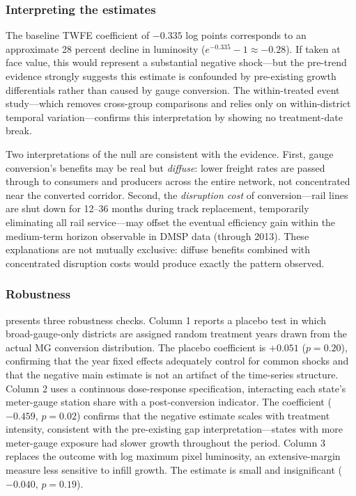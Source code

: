 \documentclass[12pt]{article}
\begin{document}
\subsubsection*{Interpreting the estimates} The baseline TWFE coefficient of $-0.335$ log points corresponds to an approximate 28 percent decline in luminosity ($e^{-0.335} - 1 \approx -0.28$). If taken at face value, this would represent a substantial negative shock---but the pre-trend evidence strongly suggests this estimate is confounded by pre-existing growth differentials rather than caused by gauge conversion. The within-treated event study---which removes cross-group comparisons and relies only on within-district temporal variation---confirms this interpretation by showing no treatment-date break.

Two interpretations of the null are consistent with the evidence. First, gauge conversion's benefits may be real but \emph{diffuse}: lower freight rates are passed through to consumers and producers across the entire network, not concentrated near the converted corridor. Second, the \emph{disruption cost} of conversion---rail lines are shut down for 12--36 months during track replacement, temporarily eliminating all rail service---may offset the eventual efficiency gain within the medium-term horizon observable in DMSP data (through 2013). These explanations are not mutually exclusive: diffuse benefits combined with concentrated disruption costs would produce exactly the pattern observed.



\subsubsection*{Robustness}  presents three robustness checks. Column 1 reports a placebo test in which broad-gauge-only districts are assigned random treatment years drawn from the actual MG conversion distribution. The placebo coefficient is $+0.051$ ($p = 0.20$), confirming that the year fixed effects adequately control for common shocks and that the negative main estimate is not an artifact of the time-series structure. Column 2 uses a continuous dose-response specification, interacting each state's meter-gauge station share with a post-conversion indicator. The coefficient ($-0.459$, $p = 0.02$) confirms that the negative estimate scales with treatment intensity, consistent with the pre-existing gap interpretation---states with more meter-gauge exposure had slower growth throughout the period. Column 3 replaces the outcome with log maximum pixel luminosity, an extensive-margin measure less sensitive to infill growth. The estimate is small and insignificant ($-0.040$, $p = 0.19$).
\end{document}
